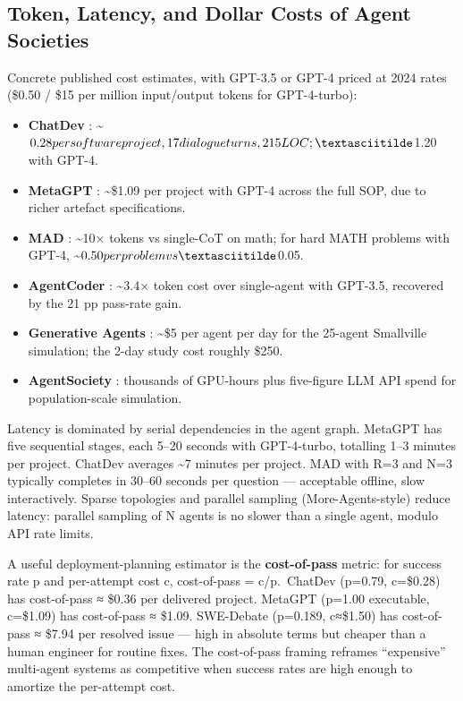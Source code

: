 \documentclass{article}
\begin{document}
\subsection{Token, Latency, and Dollar Costs of Agent Societies}\label{token-latency-and-dollar-costs-of-agent-societies}

Concrete published cost estimates, with GPT-3.5 or GPT-4 priced at 2024 rates (\$0.50 / \$15 per million input/output tokens for GPT-4-turbo):

\begin{itemize}

\item
  \textbf{ChatDev} \citep{qian20242023}: \textasciitilde$0.28 per software project, 17 dialogue turns, 215 LOC; \textasciitilde$1.20 with GPT-4.
\item
  \textbf{MetaGPT} \citep{hong20242023}: \textasciitilde\$1.09 per project with GPT-4 across the full SOP, due to richer artefact specifications.
\item
  \textbf{MAD} \citep{liang2024encouragingdiverge}: \textasciitilde10× tokens vs single-CoT on math; for hard MATH problems with GPT-4, \textasciitilde$0.50 per problem vs \textasciitilde$0.05.
\item
  \textbf{AgentCoder} \citep{huang2023agentcodermultiage}: \textasciitilde3.4× token cost over single-agent with GPT-3.5, recovered by the 21 pp pass-rate gain.
\item
  \textbf{Generative Agents} \citep{park2023generativeagentsin}: \textasciitilde\$5 per agent per day for the 25-agent Smallville simulation; the 2-day study cost roughly \$250.
\item
  \textbf{AgentSociety} \citep{piao20252025}: thousands of GPU-hours plus five-figure LLM API spend for population-scale simulation.
\end{itemize}

Latency is dominated by serial dependencies in the agent graph. MetaGPT has five sequential stages, each 5--20 seconds with GPT-4-turbo, totalling 1--3 minutes per project. ChatDev averages \textasciitilde7 minutes per project. MAD with R=3 and N=3 typically completes in 30--60 seconds per question --- acceptable offline, slow interactively. Sparse topologies and parallel sampling (More-Agents-style) reduce latency: parallel sampling of N agents is no slower than a single agent, modulo API rate limits.

A useful deployment-planning estimator is the \textbf{cost-of-pass} metric: for success rate p and per-attempt cost c, cost-of-pass = c/p.~ChatDev (p=0.79, c=\$0.28) has cost-of-pass ≈ \$0.36 per delivered project. MetaGPT (p=1.00 executable, c=\$1.09) has cost-of-pass ≈ \$1.09. SWE-Debate (p=0.189, c≈\$1.50) has cost-of-pass ≈ \$7.94 per resolved issue --- high in absolute terms but cheaper than a human engineer for routine fixes. The cost-of-pass framing reframes ``expensive'' multi-agent systems as competitive when success rates are high enough to amortize the per-attempt cost.
\end{document}
